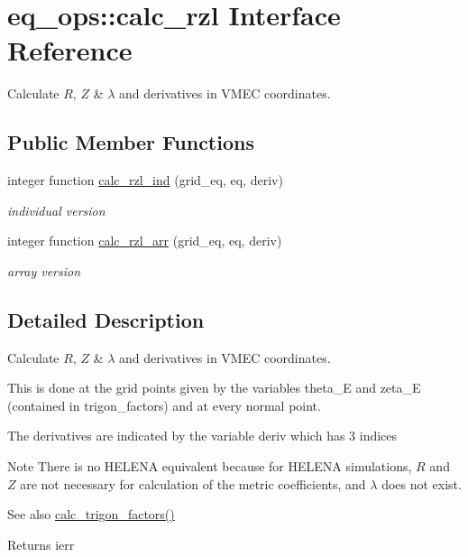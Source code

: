 \hypertarget{interfaceeq__ops_1_1calc__rzl}{}\section{eq\+\_\+ops\+:\+:calc\+\_\+rzl Interface Reference}
\label{interfaceeq__ops_1_1calc__rzl}


Calculate $R$, $Z$ \& $\lambda$ and derivatives in V\+M\+EC coordinates.  


\subsection*{Public Member Functions}
\begin{DoxyCompactItemize}
\item 
integer function \hyperlink{interfaceeq__ops_1_1calc__rzl_ac161b0609f9e3748553befd2d62d083c}{calc\+\_\+rzl\+\_\+ind} (grid\+\_\+eq, eq, deriv)
\begin{DoxyCompactList}\small\item\em individual version \end{DoxyCompactList}\item 
integer function \hyperlink{interfaceeq__ops_1_1calc__rzl_ab117adebbc8a50ce2ef9c9dfa96674bb}{calc\+\_\+rzl\+\_\+arr} (grid\+\_\+eq, eq, deriv)
\begin{DoxyCompactList}\small\item\em array version \end{DoxyCompactList}\end{DoxyCompactItemize}


\subsection{Detailed Description}
Calculate $R$, $Z$ \& $\lambda$ and derivatives in V\+M\+EC coordinates. 

This is done at the grid points given by the variables {\ttfamily theta\+\_\+E} and {\ttfamily zeta\+\_\+E} (contained in {\ttfamily trigon\+\_\+factors}) and at every normal point.

The derivatives are indicated by the variable {\ttfamily deriv} which has 3 indices

\begin{DoxyNote}{Note}
There is no H\+E\+L\+E\+NA equivalent because for H\+E\+L\+E\+NA simulations, $R$ and $Z$ are not necessary for calculation of the metric coefficients, and $\lambda$ does not exist.
\end{DoxyNote}
\begin{DoxySeeAlso}{See also}
\hyperlink{namespacevmec__utilities_ac699116fc25fdea3e28e488513d97c87}{calc\+\_\+trigon\+\_\+factors()}
\end{DoxySeeAlso}
\begin{DoxyReturn}{Returns}
ierr 
\end{DoxyReturn}


